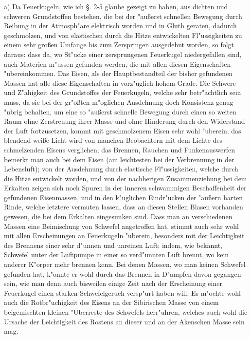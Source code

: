 \documentclass[a4paper, 11pt, oneside, polutonikogreek, german]{article}
\begin{document}
a) Da Feuerkugeln, wie ich §. 2-5 glaube gezeigt zu haben, aus dichten und schweren Grundstoffen bestehen, die bei der "außerst schnellen Bewegung durch Reibung in der Atmosph"are elektrisch worden und in Gluth geraten, dadurch geschmolzen, und von elastischen durch die Hitze entwickelten Fl"ussigkeiten zu einem sehr großen Umfange bis zum Zerspringen ausgedehnt worden, so folgt daraus: dass da, wo St"ucke einer zersprungenen Feuerkugel niedergefallen sind, auch Materien m"ussen gefunden werden, die mit allen diesen Eigenschaften "ubereinkommen. Das Eisen, als der Hauptbestandteil der bisher gefundenen Massen hat alle diese Eigenschaften in vorz"uglich hohem Grade. Die Schwere und Z"ahigkeit des Grundstoffes der Feuerkugeln, welche sehr betr"achtlich sein muss, da sie bei der gr"oßten m"oglichen Ausdehnung doch Konsistenz genug "ubrig behalten, um eine so "außerst schnelle Bewegung durch einen so weiten Raum ohne Zerstreuung ihrer Masse und ohne Hinderung durch den Widerstand der Luft fortzusetzen, kommt mit geschmolzenem Eisen sehr wohl "uberein; das blendend weiße Licht wird von manchen Beobachtern mit dem Lichte des schmelzenden Eisens verglichen; das Brennen, Rauchen und Funkenauswerfen bemerkt man auch bei dem Eisen (am leichtesten bei der Verbrennung in der Lebensluft); von der Ausdehnung durch elastische Fl"ussigkeiten, welche durch die Hitze entwickelt worden, und von der nachherigen Zusammenziehung bei dem Erkalten zeigen sich noch Spuren in der inneren schwammigen Beschaffenheit der gefundenen Eisenmassen, und in den k"uglichen Eindr"ucken der "außern harten Rinde, welche letztere vermuten lassen, dass an diesen Stellen Blasen vorhanden gewesen, die bei dem Erkalten eingesunken sind. Dass man an verschiedenen Massen eine Beimischung von Schwefel angetroffen hat, stimmt auch sehr wohl mit allen Erscheinungen an Feuerkugeln "uberein, besonders mit der Leichtigkeit des Brennens einer sehr d"unnen und unreinen Luft; indem, wie bekannt, Schwefel unter der Luftpumpe in einer so verd"unnten Luft brennt, wo kein anderer K"orper mehr brennen kenn. Bei denen Massen, wo man keinen Schwefel gefunden hat, k"onnte er wohl durch das Brennen in D"ampfen davon gegangen sein, wie man denn auch bisweilen einige Zeit nach der Erscheinung einer Feuerkugel einen starken Schwefelgeruch versp"urt haben will. Es m"ochte wohl auch die Rotbr"uchigkeit des Eisens an der Sibirischen Masse von einem beigemischten kleinen "Uberreste des Schwefels herr"uhren, welches auch wohl die Ursache der Leichtigkeit des Rostens an dieser und an der Akenschen Masse sein mag.
\end{document}
